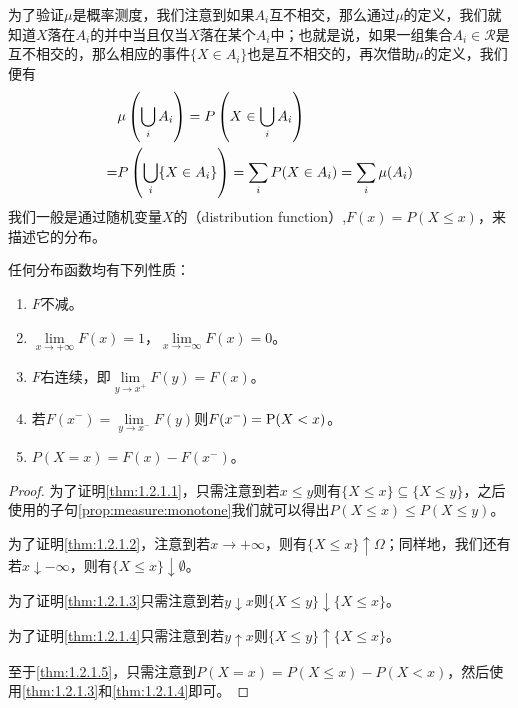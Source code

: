 \documentclass[../main.tex]{subfiles}
\begin{document}
为了验证\(\mu\)是概率测度，我们注意到如果\(A_i\)互不相交，那么通过\(\mu\)的定义，我们就知道\(X\)落在\(A_i\)的并中当且仅当\(X\)落在某个\(A_i\)中；也就是说，如果一组集合\(A_i \in \mathcal{R}\)是互不相交的，那么相应的事件\(\{X \in A_i\}\)也是互不相交的，再次借助\(\mu\)的定义，我们便有
\[\begin{split}
	&\mu\del{\bigcup_{i}A_i} = P\del{X \in \bigcup_{i}A_i}\\ =&P\del{\bigcup_{i} \{X \in A_i\}} = \sum_{i} P(X \in A_i) = \sum_i \mu(A_i)
\end{split}\]
我们一般是通过随机变量\(X\)的（distribution function）,\(F(x) = P(X \leq x)\)，来描述它的分布。

\begin{theorem} \label{thm:1.2.1}
	任何分布函数均有下列性质：
	\begin{enumerate}
		\item \label{thm:1.2.1.1} \(F\)不减。
		\item\label{thm:1.2.1.2} \(\lim\limits_{x \rightarrow +\infty} F(x) = 1\)，\(\lim\limits_{x \rightarrow -\infty} F(x) = 0\)。
		\item\label{thm:1.2.1.3} \(F\)右连续，即\(\lim\limits_{y \rightarrow x^+} F(y) = F(x)\)。
		\item\label{thm:1.2.1.4} 若\(F(x^-) = \lim\limits_{y\rightarrow x^-}F(y)\)则\(F(x^-) = \operatorname{\mathrm{P}}(X < x)\)。
		\item\label{thm:1.2.1.5} \(P(X=x) = F(x) - F(x^-)\)。
	\end{enumerate}
\end{theorem}
\begin{proof}
	为了证明\ref{thm:1.2.1.1}，只需注意到若\(x \leq y\)则有\(\{X \leq x\} \subseteq \{X \leq y\}\)，之后使用的子句\ref{prop:measure:monotone}我们就可以得出\(P(X \leq x) \leq P(X \leq y)\)。

	为了证明\ref{thm:1.2.1.2}，注意到若\(x \rightarrow +\infty\)，则有\(\{X \leq x\} \uparrow \Omega\)；同样地，我们还有若\(x \downarrow -\infty\)，则有\(\{X \leq x\} \downarrow \emptyset\)。

	为了证明\ref{thm:1.2.1.3}只需注意到若\(y\downarrow x\)则\(\{X \leq y\} \downarrow \{X \leq x\}\)。

	为了证明\ref{thm:1.2.1.4}只需注意到若\(y\uparrow x\)则\(\{X \leq y\} \uparrow \{X \leq x\}\)。

	至于\ref{thm:1.2.1.5}，只需注意到\(P(X = x) = P(X \leq x) - P(X < x)\)，然后使用\ref{thm:1.2.1.3}和\ref{thm:1.2.1.4}即可。
\end{proof}
\end{document}
